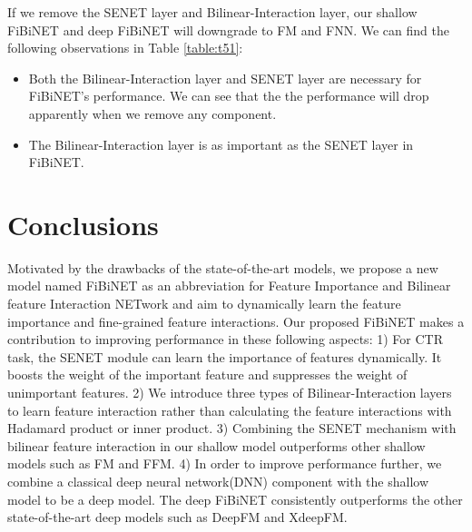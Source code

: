 \documentclass[sigconf]{acmart}
\begin{document}
If we remove the SENET layer and Bilinear-Interaction layer, our shallow FiBiNET and deep FiBiNET will downgrade to FM and FNN. We can find the following observations in Table \ref{table:t51}:
\begin{itemize}
\item Both the Bilinear-Interaction layer and SENET layer are necessary for FiBiNET's performance. We can see that the the performance will drop apparently when we remove any component. 
\item The Bilinear-Interaction layer is as important as the SENET layer in FiBiNET. 

\end{itemize}

\section{Conclusions}
\label{sec:s5}
Motivated by the drawbacks of the state-of-the-art models, 
we propose a new model named FiBiNET as an abbreviation for Feature Importance and Bilinear feature Interaction NETwork and aim to dynamically learn the feature importance and fine-grained feature interactions. Our proposed FiBiNET makes a contribution to
improving performance in these following aspects: 1) For CTR task, the
SENET module can learn the importance of features dynamically. It boosts
the weight of the important feature and suppresses the weight of
unimportant features. 2) We introduce three types of
Bilinear-Interaction layers to learn feature interaction rather than
calculating the feature interactions with Hadamard product or inner
product. 3) Combining the SENET mechanism with bilinear feature
interaction in our shallow model outperforms other shallow models such
as FM and FFM. 4) In order to improve performance further, we combine a classical deep neural network(DNN) component with the shallow model to be a deep model. The deep FiBiNET consistently outperforms the other state-of-the-art deep models such as DeepFM and XdeepFM.



\end{document}
